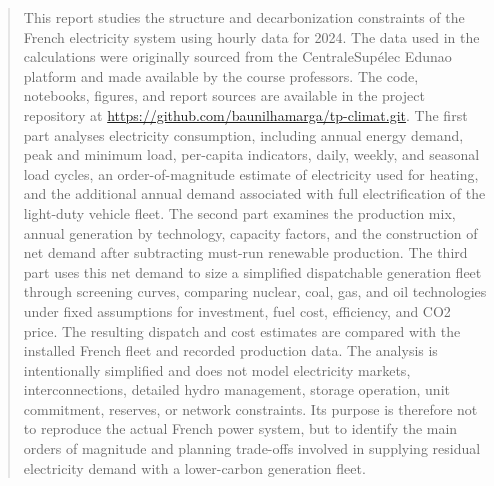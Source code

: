\documentclass[a4paper]{report}
\begin{document}
\begin{abstract}
This report studies the structure and decarbonization constraints of the French electricity system using hourly data for 2024. The data used in the calculations were originally sourced from the CentraleSupélec Edunao platform and made available by the course professors. The code, notebooks, figures, and report sources are available in the project repository at \url{https://github.com/baunilhamarga/tp-climat.git}. The first part analyses electricity consumption, including annual energy demand, peak and minimum load, per-capita indicators, daily, weekly, and seasonal load cycles, an order-of-magnitude estimate of electricity used for heating, and the additional annual demand associated with full electrification of the light-duty vehicle fleet. The second part examines the production mix, annual generation by technology, capacity factors, and the construction of net demand after subtracting must-run renewable production. The third part uses this net demand to size a simplified dispatchable generation fleet through screening curves, comparing nuclear, coal, gas, and oil technologies under fixed assumptions for investment, fuel cost, efficiency, and CO2 price. The resulting dispatch and cost estimates are compared with the installed French fleet and recorded production data. The analysis is intentionally simplified and does not model electricity markets, interconnections, detailed hydro management, storage operation, unit commitment, reserves, or network constraints. Its purpose is therefore not to reproduce the actual French power system, but to identify the main orders of magnitude and planning trade-offs involved in supplying residual electricity demand with a lower-carbon generation fleet.
\end{abstract}

\restoregeometry

\newpage
{}
\pagestyle{empty}

\tableofcontents
\restoregeometry
\newpage
{}
\pagestyle{fancy}

\renewcommand{\arraystretch}{1.5}


\end{document}

